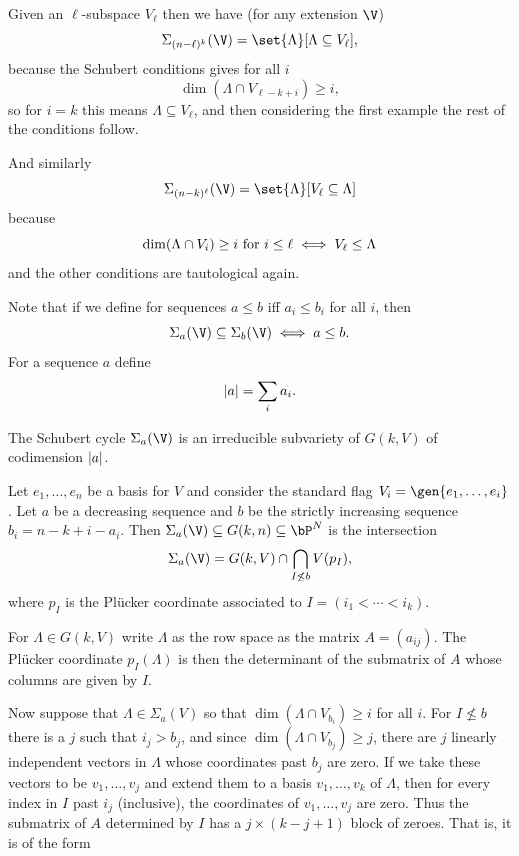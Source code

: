 \bexam

    Given an $\ell$-subspace $V_\ell$ then we have (for any extension $\V$)
    $$ \Sigma_{(n-\ell)^k}(\V) = \set{\Lambda}[\Lambda\subseteq V_\ell] , $$
    because the Schubert conditions gives for all $i$
    $$ \dim(\Lambda\cap V_{\ell-k+i}) \geq i , $$
    so for $i=k$ this means $\Lambda\subseteq V_\ell$, and then considering the first example the rest of
    the conditions follow.

    And similarly
    $$ \Sigma_{(n-k)^\ell}(\V) = \set{\Lambda}[V_\ell\subseteq\Lambda] $$
    because
    $$ \dim(\Lambda\cap V_i) \geq i \hbox{ for $i\leq\ell$} \iff V_\ell \leq \Lambda $$
    and the other conditions are tautological again.

\eexam

Note that if we define for sequences $a\leq b$ iff $a_i\leq b_i$ for all $i$, then
$$ \Sigma_a(\V) \subseteq \Sigma_b(\V) \iff a \leq b . $$
For a sequence $a$ define
$$ \mathopen{}\mathclose{\left|a\right|} = \sum_i a_i . $$

\bthrm

    The Schubert cycle $\Sigma_a(\V)$ is an irreducible subvariety of $G(k,V)$ of codimension $\mathopen{}\mathclose{\left|a\right|}$.

\ethrm

\bprop[name={intwithlin}]

    Let $e_1,\dots,e_n$ be a basis for $V$ and consider the standard flag $V_i=\gen{e_1,\dots,e_i}$.
    Let $a$ be a decreasing sequence and $b$ be the strictly increasing sequence $b_i=n-k+i-a_i$.
    Then $\Sigma_a(\V)\subseteq G(k,n)\subseteq\bP^N$ is the intersection
    $$ \Sigma_a(\V) = G(k,V) \cap \bigcap_{I\not\leq b}V(p_I) , $$
    where $p_I$ is the Pl\"ucker coordinate associated to $I=(i_1<\cdots<i_k)$.

\eprop

\bproof

    For $\Lambda\in G(k,V)$ write $\Lambda$ as the row space as the matrix $A=(a_{ij})$.
    The Pl\"ucker coordinate $p_I(\Lambda)$ is then the determinant of the submatrix of $A$ whose columns
    are given by $I$.

    Now suppose that $\Lambda\in\Sigma_a(V)$ so that $\dim(\Lambda\cap V_{b_i})\geq i$ for all $i$.
    For $I\not\leq b$ there is a $j$ such that $i_j>b_j$, and since $\dim(\Lambda\cap V_{b_j})\geq j$,
    there are $j$ linearly independent vectors in $\Lambda$ whose coordinates past $b_j$ are zero.
    If we take these vectors to be $v_1,\dots,v_j$ and extend them to a basis $v_1,\dots,v_k$ of $\Lambda$,
    then for every index in $I$ past $i_j$ (inclusive), the coordinates of $v_1,\dots,v_j$ are zero.
    Thus the submatrix of $A$ determined by $I$ has a $j\times(k-j+1)$ block of zeroes.
    That is, it is of the form


